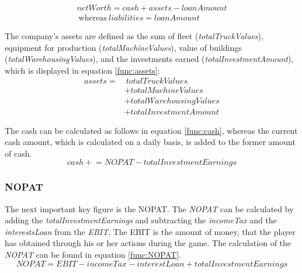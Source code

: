 \begin{equation}
\label{func:netWorth}
\begin{split}
    netWorth = cash + assets - loanAmount \\ ~\text{whereas}~liabilities = loanAmount
    \end{split}
\end{equation}

The company's assets are defined as the sum of fleet (\textit{totalTruckValues}), equipment for production (\textit{totalMachineValues}), value of buildings (\textit{totalWarehousingValues}), and the investments earned (\textit{totalInvestmentAmount}), which is displayed in equation \ref{func:assets}:
\begin{equation}
    \label{func:assets}
    \begin{aligned}
        assets = & ~totalTruckValues \\
        &+ totalMachineValues \\ 
        &+ totalWarehousingValues \\
        &+ totalInvestmentAmount
    \end{aligned}
\end{equation}

The cash can be calculated as follows in equation \ref{func:cash}, whereas the current cash amount, which is calculated on a daily basis, is added to the former amount of cash.
\begin{equation}
    \label{func:cash}
    cash \mathrel{+}= NOPAT - totalInvestmentEarnings %
\end{equation}

\subsubsection{NOPAT}

The next important key figure is the \gls{NOPAT}. The \textit{NOPAT} can be calculated by adding the \textit{totalInvestmentEarnings} and subtracting the \textit{incomeTax} and the \textit{interestsLoan} from the \textit{EBIT}. The \gls{EBIT} is the amount of money, that the player has obtained through his or her actions during the game. The calculation of the \textit{NOPAT} can be found in equation \ref{func:NOPAT}.
\begin{equation}
    \label{func:NOPAT}
    NOPAT = EBIT - incomeTax - interestLoan + totalInvestmentEarnings
\end{equation}
 
